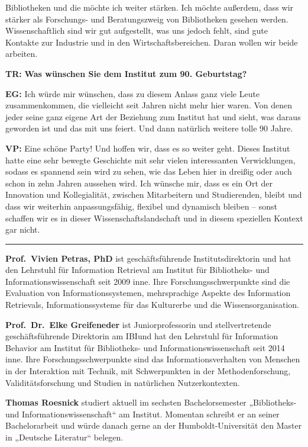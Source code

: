\documentclass[a4paper,
fontsize=11pt,
oneside,
numbers=noperiodatend,
parskip=half-,
bibliography=totoc,
final
]{scrartcl}
\begin{document}
Bibliotheken und die möchte ich weiter stärken. Ich möchte außerdem,
dass wir stärker als Forschungs- und Beratungszweig von Bibliotheken
gesehen werden. Wissenschaftlich sind wir gut aufgestellt, was uns
jedoch fehlt, sind gute Kontakte zur Industrie und in den
Wirtschaftsbereichen. Daran wollen wir beide arbeiten.

\textbf{TR:} \textbf{Was wünschen Sie dem Institut zum 90. Geburtstag?}

\textbf{EG:} Ich würde mir wünschen, dass zu diesem Anlass ganz viele
Leute zusammenkommen, die vielleicht seit Jahren nicht mehr hier waren.
Von denen jeder seine ganz eigene Art der Beziehung zum Institut hat und
sieht, was daraus geworden ist und das mit uns feiert. Und dann
natürlich weitere tolle 90 Jahre.

\textbf{VP:} Eine schöne Party! Und hoffen wir, dass es so weiter geht.
Dieses Institut hatte eine sehr bewegte Geschichte mit sehr vielen
interessanten Verwicklungen, sodass es spannend sein wird zu sehen, wie
das Leben hier in dreißig oder auch schon in zehn Jahren aussehen wird.
Ich wünsche mir, dass es ein Ort der Innovation und Kollegialität,
zwischen Mitarbeitern und Studierenden, bleibt und dass wir weiterhin
anpassungsfähig, flexibel und dynamisch bleiben -- sonst schaffen wir es
in dieser Wissenschaftslandschaft und in diesem speziellen Kontext gar
nicht.

\begin{center}\rule{0.5\linewidth}{\linethickness}\end{center}

\textbf{Prof.~Vivien Petras, PhD} ist geschäftsführende
Institutsdirektorin und hat den Lehrstuhl für Information Retrieval am
Institut für Bibliotheks- und Informationswissenschaft seit 2009 inne.
Ihre Forschungsschwerpunkte sind die Evaluation von
Informationssystemen, mehrsprachige Aspekte des Information Retrievals,
Informationssysteme für das Kulturerbe und die Wissensorganisation.

\textbf{Prof.~Dr.~Elke Greifeneder} ist Juniorprofessorin und
stellvertretende geschäftsführende Direktorin am IBIund hat den
Lehrstuhl für Information Behavior am Institut für Bibliotheks- und
Informationswissenschaft seit 2014 inne. Ihre Forschungsschwerpunkte
sind das Informationsverhalten von Menschen in der Interaktion mit
Technik, mit Schwerpunkten in der Methodenforschung, Validitätsforschung
und Studien in natürlichen Nutzerkontexten.

\textbf{Thomas Roesnick} studiert aktuell im sechsten Bachelorsemester
„Bibliotheks- und Informationswissenschaft`` am Institut. Momentan
schreibt er an seiner Bachelorarbeit und würde danach gerne an der
Humboldt-Universität den Master in „Deutsche Literatur`` belegen.
\end{document}

